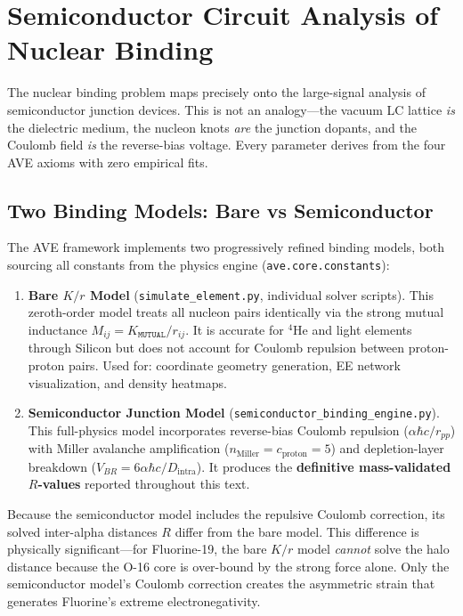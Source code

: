 \section{Semiconductor Circuit Analysis of Nuclear Binding}
\label{sec:semiconductor_nuclear}

The nuclear binding problem maps precisely onto the large-signal analysis of semiconductor junction devices. This is not an analogy---the vacuum LC lattice \textit{is} the dielectric medium, the nucleon knots \textit{are} the junction dopants, and the Coulomb field \textit{is} the reverse-bias voltage. Every parameter derives from the four AVE axioms with zero empirical fits.

\subsection{Two Binding Models: Bare vs Semiconductor}
\label{sec:two_models}

The AVE framework implements two progressively refined binding models, both sourcing all constants from the physics engine (\texttt{ave.core.constants}):

\begin{enumerate}
    \item \textbf{Bare $K/r$ Model} (\texttt{simulate\_element.py}, individual solver scripts). This zeroth-order model treats all nucleon pairs identically via the strong mutual inductance $M_{ij} = K_{\texttt{MUTUAL}} / r_{ij}$. It is accurate for $^4$He and light elements through Silicon but does not account for Coulomb repulsion between proton-proton pairs. Used for: coordinate geometry generation, EE network visualization, and density heatmaps.

    \item \textbf{Semiconductor Junction Model} (\texttt{semiconductor\_binding\_engine.py}). This full-physics model incorporates reverse-bias Coulomb repulsion ($\alpha\hbar c / r_{pp}$) with Miller avalanche amplification ($n_{\text{Miller}} = c_{\text{proton}} = 5$) and depletion-layer breakdown ($V_{BR} = 6\alpha\hbar c / D_{\text{intra}}$). It produces the \textbf{definitive mass-validated $R$-values} reported throughout this text.
\end{enumerate}

Because the semiconductor model includes the repulsive Coulomb correction, its solved inter-alpha distances $R$ differ from the bare model. This difference is physically significant---for Fluorine-19, the bare $K/r$ model \textit{cannot} solve the halo distance because the O-16 core is over-bound by the strong force alone. Only the semiconductor model's Coulomb correction creates the asymmetric strain that generates Fluorine's extreme electronegativity.

